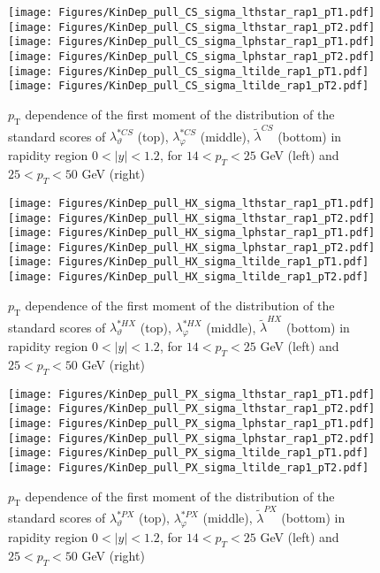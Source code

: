 \documentclass[12pt]{article}
\newcommand{\pT}{p_\mathrm{T}}
\newcommand{\absy}{\left |  y \right |}
\newcommand{\lamtildeCS}{\tilde{\lambda}^{\scriptscriptstyle CS}}
\newcommand{\lamthstarCS}{\lambda^{* \scriptscriptstyle CS}_\vartheta}
\newcommand{\lamphstarCS}{\lambda^{* \scriptscriptstyle CS}_\varphi}
\newcommand{\lamtildeHX}{\tilde{\lambda}^{\scriptscriptstyle HX}}
\newcommand{\lamthstarHX}{\lambda^{* \scriptscriptstyle HX}_\vartheta}
\newcommand{\lamphstarHX}{\lambda^{* \scriptscriptstyle HX}_\varphi}
\newcommand{\lamtildePX}{\tilde{\lambda}^{\scriptscriptstyle PX}}
\newcommand{\lamthstarPX}{\lambda^{* \scriptscriptstyle PX}_\vartheta}
\newcommand{\lamphstarPX}{\lambda^{* \scriptscriptstyle PX}_\varphi}
\begin{document}
\begin{figure}[htbp]
\centering
\texttt{[image: Figures/KinDep\_pull\_CS\_sigma\_lthstar\_rap1\_pT1.pdf]}
\texttt{[image: Figures/KinDep\_pull\_CS\_sigma\_lthstar\_rap1\_pT2.pdf]}
\texttt{[image: Figures/KinDep\_pull\_CS\_sigma\_lphstar\_rap1\_pT1.pdf]}
\texttt{[image: Figures/KinDep\_pull\_CS\_sigma\_lphstar\_rap1\_pT2.pdf]}
\texttt{[image: Figures/KinDep\_pull\_CS\_sigma\_ltilde\_rap1\_pT1.pdf]}
\texttt{[image: Figures/KinDep\_pull\_CS\_sigma\_ltilde\_rap1\_pT2.pdf]}
\caption{$\pT$ dependence of the first moment of the distribution of the
standard scores of $\lamthstarCS$ (top), $\lamphstarCS$ (middle), $\lamtildeCS$
(bottom) in rapidity region $0<\absy<1.2$, for $14 < p_T < 25$ GeV (left) and
$25 < p_T < 50$ GeV (right)}
\end{figure}
\clearpage


\begin{figure}[htbp]
\centering
\texttt{[image: Figures/KinDep\_pull\_HX\_sigma\_lthstar\_rap1\_pT1.pdf]}
\texttt{[image: Figures/KinDep\_pull\_HX\_sigma\_lthstar\_rap1\_pT2.pdf]}
\texttt{[image: Figures/KinDep\_pull\_HX\_sigma\_lphstar\_rap1\_pT1.pdf]}
\texttt{[image: Figures/KinDep\_pull\_HX\_sigma\_lphstar\_rap1\_pT2.pdf]}
\texttt{[image: Figures/KinDep\_pull\_HX\_sigma\_ltilde\_rap1\_pT1.pdf]}
\texttt{[image: Figures/KinDep\_pull\_HX\_sigma\_ltilde\_rap1\_pT2.pdf]}
\caption{$\pT$ dependence of the first moment of the distribution of the
standard scores of $\lamthstarHX$ (top), $\lamphstarHX$ (middle), $\lamtildeHX$
(bottom) in rapidity region $0<\absy<1.2$, for $14 < p_T < 25$ GeV (left) and
$25 < p_T < 50$ GeV (right)}
\end{figure}
\clearpage


\begin{figure}[htbp]
\centering
\texttt{[image: Figures/KinDep\_pull\_PX\_sigma\_lthstar\_rap1\_pT1.pdf]}
\texttt{[image: Figures/KinDep\_pull\_PX\_sigma\_lthstar\_rap1\_pT2.pdf]}
\texttt{[image: Figures/KinDep\_pull\_PX\_sigma\_lphstar\_rap1\_pT1.pdf]}
\texttt{[image: Figures/KinDep\_pull\_PX\_sigma\_lphstar\_rap1\_pT2.pdf]}
\texttt{[image: Figures/KinDep\_pull\_PX\_sigma\_ltilde\_rap1\_pT1.pdf]}
\texttt{[image: Figures/KinDep\_pull\_PX\_sigma\_ltilde\_rap1\_pT2.pdf]}
\caption{$\pT$ dependence of the first moment of the distribution of the
standard scores of $\lamthstarPX$ (top), $\lamphstarPX$ (middle), $\lamtildePX$
(bottom) in rapidity region $0<\absy<1.2$, for $14 < p_T < 25$ GeV (left) and
$25 < p_T < 50$ GeV (right)}
\end{figure}
\clearpage
\end{document}
